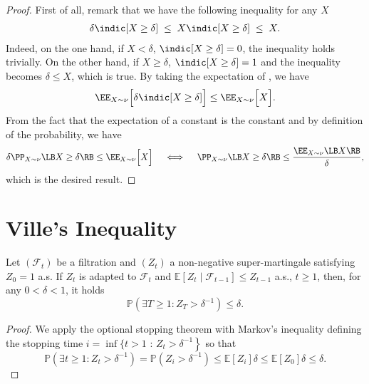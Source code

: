 \begin{noaddcontents}\begin{proof}
First of all, remark that we have the following inequality for any $X$
\begin{align}
    \delta\indic[X \ge \delta] \;\le\; X\indic[X \ge \delta] \;\le\; X.
    \label{ap:tools:eq:proof-general-markov}
\end{align}
Indeed, on the one hand, if $X<\delta$, $\indic[X \ge \delta]=0$, the inequality holds trivially.
On the other hand, if $X\ge\delta$, $\indic[X \ge \delta]=1$ and the inequality becomes $\delta\le X$, which is true.
By taking the expectation of , we have
\begin{align*}
    \EE_{X\sim\nu}\Big[\delta\indic[X \ge \delta]\Big] \le \EE_{X\sim\nu}\Big[ X\Big].
\end{align*}
From the fact that the expectation of a constant is the constant and by definition of the probability, we have
\begin{align*}
    \delta\PP_{X\sim\nu}\LB X \ge \delta\RB \le \EE_{X\sim\nu}\Big[ X\Big] \quad\iff\quad \PP_{X\sim\nu}\LB X \ge \delta\RB \le \frac{\EE_{X\sim\nu}\LB X\RB}{\delta},
\end{align*}
which is the desired result.
\end{proof}\end{noaddcontents}

\section{Ville's Inequality}

\begin{lemma}
    Let $\left(\mathcal{F}_{t}\right)$ be a filtration and $\left(Z_{t}\right)$ a non-negative super-martingale satisfying $Z_{0}=1$ a.s. If $Z_{t}$ is adapted to $\mathcal{F}_{t}$
    and $\mathbb{E}\left[Z_{t} \mid \mathcal{F}_{t-1}\right] \leq Z_{t-1}$ a.s., $t \geq 1$, then, for any $0<\delta<1$, it holds
    $$
    \mathbb{P}\left(\exists T \geq 1: Z_{T}>\delta^{-1}\right) \leq \delta.
    $$
    \end{lemma}
    
    \begin{noaddcontents}\begin{proof}
      We apply the optional stopping theorem \citep[][Thm 4.8.4]{durrett2019probability} with Markov's inequality defining the stopping time $i=\inf \{t>1$ : $\left.Z_{t}>\delta^{-1}\right\}$ so that
      $$
      \mathbb{P}\left(\exists t \geq 1: Z_{t}>\delta^{-1}\right)=\mathbb{P}\left(Z_{i}>\delta^{-1}\right) \leq \mathbb{E}\left[Z_{i}\right] \delta \leq \mathbb{E}\left[Z_{0}\right] \delta \leq \delta.
      $$
    \end{proof}\end{noaddcontents}
    